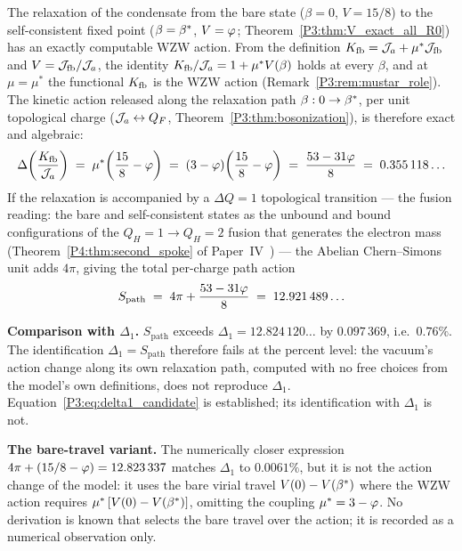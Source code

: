 \begin{remark}
\label{P3:rem:delta1_candidate}
The relaxation of the condensate from the bare state ($\beta=0$,
$V=15/8$) to the self-consistent fixed point ($\beta=\beta^{*}$, $V=\varphi$;
Theorem~\ref{P3:thm:V_exact_all_R0}) has an exactly computable WZW
action. From the definition $K_{\mathrm{fb}} = \mathcal{J}_a + \mu^*\mathcal{J}_{\mathrm{fb}}$ and $V = \mathcal{J}_{\mathrm{fb}}/\mathcal{J}_a$,
the identity $K_{\mathrm{fb}}/\mathcal{J}_a = 1 + \mu^*V(\beta)$ holds at every $\beta$, and
at $\mu = \mu^*$ the functional $K_{\mathrm{fb}}$ is the WZW action
(Remark~\ref{P3:rem:mustar_role}). The kinetic action released along
the relaxation path $\beta: 0 \to \beta^{*}$, per unit topological charge
($\mathcal{J}_a \leftrightarrow Q_F$, Theorem~\ref{P3:thm:bosonization}), is
therefore exact and algebraic:
\begin{equation}
  \Delta\!\left(\frac{K_{\mathrm{fb}}}{\mathcal{J}_a}\right)
  \;=\; \mu^*\!\left(\frac{15}{8}-\varphi\right)
  \;=\; (3-\varphi)\!\left(\frac{15}{8}-\varphi\right)
  \;=\; \frac{53-31\varphi}{8}
  \;=\; 0.355\,118\ldots
  \label{P3:eq:delta1_candidate}
\end{equation}
If the relaxation is accompanied by a $\Delta Q=1$ topological
transition --- the fusion reading: the bare and self-consistent states
as the unbound and bound configurations of the $Q_H{=}1\to Q_H{=}2$
fusion that generates the electron mass (Theorem~\ref{P4:thm:second_spoke}
of Paper~IV~\cite{Paper4}) --- the Abelian Chern--Simons unit adds $4\pi$, giving the total
per-charge path action
\[
  S_{\mathrm{path}} \;=\; 4\pi + \frac{53-31\varphi}{8} \;=\; 12.921\,489\ldots
\]

\textbf{Comparison with $\Delta_1$.} $S_{\mathrm{path}}$ exceeds
$\Delta_1 = 12.824\,120\ldots$ by $0.097\,369$, i.e.\ $0.76\%$. The
identification $\Delta_1 = S_{\mathrm{path}}$ therefore fails at the
percent level: the vacuum's action change along its own relaxation
path, computed with no free choices from the model's own definitions,
does not reproduce $\Delta_1$.
Equation~\eqref{P3:eq:delta1_candidate} is established; its
identification with $\Delta_1$ is not.

\textbf{The bare-travel variant.} The numerically closer expression
$4\pi + (15/8-\varphi) = 12.823\,337$ matches $\Delta_1$ to $0.0061\%$, but
it is not the action change of the model: it uses the bare virial
travel $V(0)-V(\beta^{*})$ where the WZW action requires
$\mu^*\,[V(0)-V(\beta^{*})]$, omitting the coupling $\mu^* = 3-\varphi$. No
derivation is known that selects the bare travel over the action; it is
recorded as a numerical observation only.


\end{remark}
